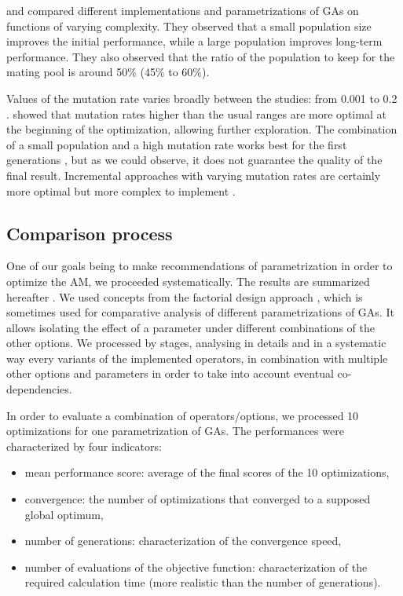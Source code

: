 \documentclass[twocol]{ametsoc}
\begin{document}
\citet{DeJong1975a} and \citet{Grefenstette1986} compared different implementations and parametrizations of GAs on functions of varying complexity. They observed that a small population size improves the initial performance, while a large population improves long-term performance. They also observed that the ratio of the population to keep for the mating pool is around 50\% (45\% to 60\%).

Values of the mutation rate varies broadly between the studies: from 0.001 \citep{DeJong1975a} to 0.2 \citep{Haupt2004}. \citet{Back1996b} showed that mutation rates higher than the usual ranges are more optimal at the beginning of the optimization, allowing further exploration. The combination of a small population and a high mutation rate works best for the first generations \citep{DeJong1975a, Back1996b, Haupt2004}, but as we could observe, it does not guarantee the quality of the final result. Incremental approaches with varying mutation rates are certainly more optimal but more complex to implement \citep{Back1996a, Back1996b}.


\subsection{Comparison process}

One of our goals being to make recommendations of parametrization in order to optimize the AM, we proceeded systematically. The results are summarized hereafter \citep[see][for the details]{Horton2012a}. We used concepts from the factorial design approach \citep[see eg.][]{Costa2005a,Costa2007a,Mariano2010a}, which is sometimes used for comparative analysis of different parametrizations of GAs. It allows isolating the effect of a parameter under different combinations of the other options. We processed by stages, analysing in details and in a systematic way every variants of the implemented operators, in combination with multiple other options and parameters in order to take into account eventual co-dependencies. 

In order to evaluate a combination of operators/options, we processed 10 optimizations for one parametrization of GAs. The performances were characterized by four indicators:

\begin{itemize}
	\item mean performance score: average of the final scores of the 10 optimizations,
	\item convergence: the number of optimizations that converged to a supposed global optimum,
	\item number of generations: characterization of the convergence speed,
	\item number of evaluations of the objective function: characterization of the required calculation time (more realistic than the number of generations).
\end{itemize}
\end{document}
